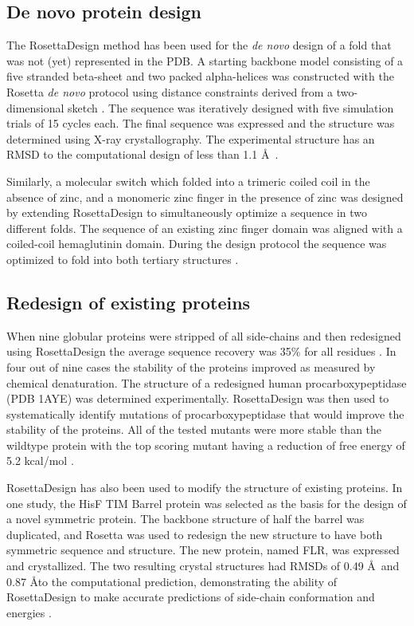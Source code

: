\subsection{De novo protein design}

The RosettaDesign method has been used for the \textit{de novo} design of a fold that was not (yet) represented in the \ac{PDB}.
A starting backbone model consisting of a five stranded beta-sheet and two packed alpha-helices was constructed with the Rosetta \textit{de novo} protocol using distance constraints derived from a two-dimensional sketch  \citep{Rohl:2004dh}.
The sequence was iteratively designed with five simulation trials of 15 cycles each.
The final sequence was expressed and the structure was determined using X-ray crystallography.
The experimental structure has an \ac{RMSD} to the computational design of less than 1.1 \AA\  \citep{Kuhlman:2003kp}. 

Similarly, a molecular switch which folded into a trimeric coiled coil in the absence of zinc, and a monomeric zinc finger in the presence of zinc was designed by extending RosettaDesign to simultaneously optimize a sequence in two different folds.
The sequence of an existing zinc finger domain was aligned with a coiled-coil hemaglutinin domain.
During the design protocol the sequence was optimized to fold into both tertiary structures  \citep{Ambroggio:2006he}.

\subsection{Redesign of existing proteins}
When nine globular proteins were stripped of all side-chains and then redesigned using RosettaDesign the average sequence recovery was 35\% for all residues  \citep{Kuhlman:2003kp}.
In four out of nine cases the stability of the proteins improved as measured by chemical denaturation.
The structure of a redesigned human procarboxypeptidase (\ac{PDB} 1AYE)  \citep{GarciaSaez:1997cn} was determined experimentally.
RosettaDesign was then used to systematically identify mutations of procarboxypeptidase that would improve the stability of the proteins.
All of the tested mutants were more stable than the wildtype protein with the top scoring mutant having a reduction of free energy of 5.2 kcal/mol  \citep{Dantas:2007iq}.

RosettaDesign has also been used to modify the structure of existing proteins.
In one study, the HisF TIM Barrel protein was selected as the basis for the design of a novel symmetric protein.
The backbone structure of half the barrel was duplicated, and Rosetta was used to redesign the new structure to have both symmetric sequence and structure.
The new protein, named FLR, was expressed and crystallized.
The two resulting crystal structures had RMSDs of 0.49 \AA\ and 0.87 \AA to the computational prediction, demonstrating the ability of RosettaDesign to make accurate predictions of side-chain conformation and energies  \citep{Fortenberry:2011hw}.

